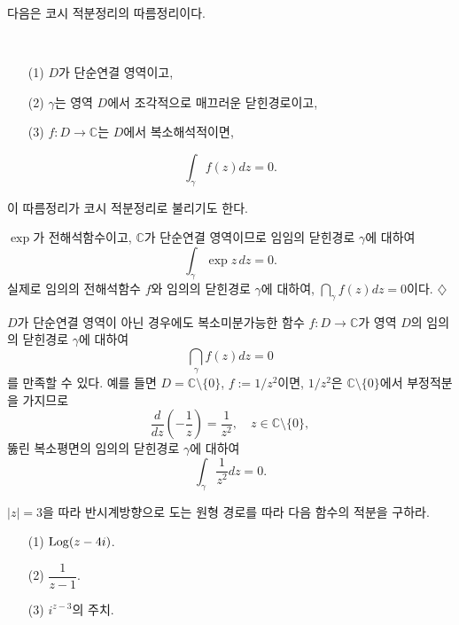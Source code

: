 다음은 코시 적분정리의 따름정리이다.

\begin{salt_corollary} \label{coro-3-2}
\
\begin{itemize}
\item[(1)] $D$가 단순연결 영역이고,
\item[(2)] $\gamma$는 영역 $D$에서 조각적으로 매끄러운 닫힌경로이고,
\item[(3)] $f:D\to\mathbb C$는 $D$에서 복소해석적이면,
\end{itemize}
\[
\int_\gamma f(z)dz = 0.
\]
\end{salt_corollary}

이 따름정리가 코시 적분정리로 불리기도 한다.

\begin{salt_example} \label{example-3-9}
$\exp$가 전해석함수이고, $\mathbb C$가 단순연결 영역이므로
임임의 닫힌경로 $\gamma$에 대하여
\[
\int_\gamma \exp z \, dz = 0.
\]
실제로 임의의 전해석함수 $f$와 임의의 닫힌경로 $\gamma$에 대하여, $\dint_\gamma f(z)dz=0$이다.
\hfill $\diamondsuit$
\end{salt_example}

$D$가 단순연결 영역이 아닌 경우에도 복소미분가능한 함수 $f:D\to \mathbb C$가
영역 $D$의 임의의 닫힌경로 $\gamma$에 대하여
\[
\dint_\gamma f(z)dz=0
\]
를 만족할 수 있다.
예를 들면 $D=\mathbb C\setminus \{0\}$, $f:=1/z^2$이면,
$1/z^2$은 $\mathbb C\setminus \{0\}$에서 부정적분을 가지므로
\[
\dfrac d{dz}\left(- \dfrac 1z\right) = \dfrac1{z^2}, \quad z\in \mathbb C\setminus \{0\},
\]
뚫린 복소평면의 임의의 닫힌경로 $\gamma$에 대하여
\[
\int_\gamma \dfrac 1{z^2}dz=0.
\]

\begin{salt_exercise} \label{ex-3-20}
$|z|=3$을 따라 반시계방향으로 도는 원형 경로를 따라 다음 함수의 적분을 구하라.
\begin{itemize}
\item[(1)] $\mathop{\mathrm{Log}} (z-4i)$.
\item[(2)] $\dfrac1{z-1}$.
\item[(3)] $i^{z-3}$의 주치.
\end{itemize}
\end{salt_exercise}

